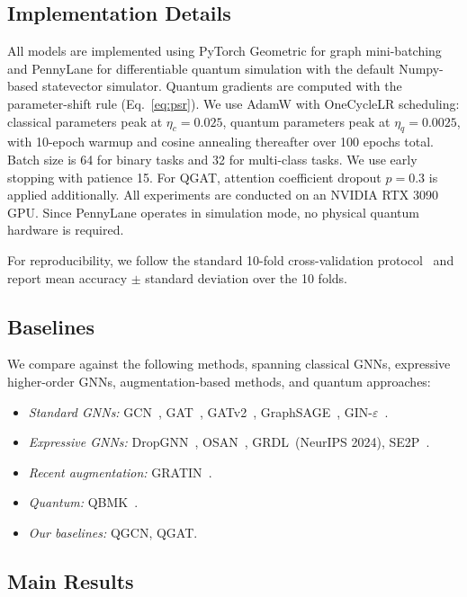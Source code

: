 \documentclass[journal]{IEEEtran}
\begin{document}
\subsection{Implementation Details}

All models are implemented using PyTorch Geometric for
graph mini-batching and PennyLane for differentiable
quantum simulation with the default Numpy-based statevector simulator.
Quantum gradients are computed with the parameter-shift rule
(Eq.~\eqref{eq:psr}). We use AdamW with OneCycleLR scheduling: classical
parameters peak at $\eta_c = 0.025$, quantum parameters peak at
$\eta_q = 0.0025$, with 10-epoch warmup and cosine annealing thereafter
over 100 epochs total. Batch size is 64 for binary tasks and 32 for
multi-class tasks. We use early stopping with patience 15. For QGAT,
attention coefficient dropout $p = 0.3$ is applied additionally. All
experiments are conducted on an NVIDIA RTX 3090 GPU. Since PennyLane
operates in simulation mode, no physical quantum hardware is required.

For reproducibility, we follow the standard 10-fold cross-validation
protocol~\cite{Errica2020} and report mean accuracy $\pm$ standard
deviation over the 10 folds.

\subsection{Baselines}

We compare against the following methods, spanning classical GNNs, expressive
higher-order GNNs, augmentation-based methods, and quantum approaches:
\begin{itemize}[leftmargin=*, noitemsep]
  \item \textit{Standard GNNs:} GCN~\cite{Kipf2017}, GAT~\cite{Velickovic2018},
    GATv2~\cite{Brody2022ICLR}, GraphSAGE~\cite{Hamilton2017},
    GIN-$\varepsilon$~\cite{Xu2019GIN}.
  \item \textit{Expressive GNNs:} DropGNN~\cite{Papp2021NeurIPS},
    OSAN~\cite{Bause2023ICML}, GRDL~(NeurIPS 2024), SE2P~\cite{Saber2024CIKM}.
  \item \textit{Recent augmentation:} GRATIN~\cite{Abbahaddou2025ICML}.
  \item \textit{Quantum:} QBMK~\cite{Bai2024ICML}.
  \item \textit{Our baselines:}
    QGCN, QGAT.
\end{itemize}

\subsection{Main Results}
\end{document}
